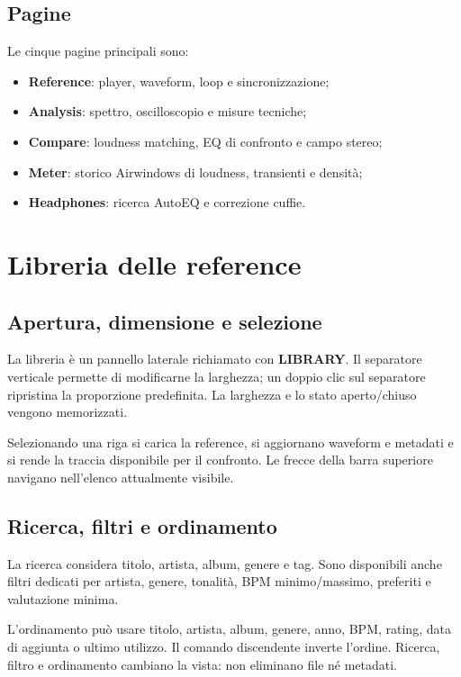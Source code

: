 \documentclass[11pt,a4paper]{article}
\newcommand{\control}[1]{\textbf{\textsf{#1}}}
\begin{document}
\subsection{Pagine}

Le cinque pagine principali sono:

\begin{itemize}
  \item \control{Reference}: player, waveform, loop e sincronizzazione;
  \item \control{Analysis}: spettro, oscilloscopio e misure tecniche;
  \item \control{Compare}: loudness matching, EQ di confronto e campo stereo;
  \item \control{Meter}: storico Airwindows di loudness, transienti e densità;
  \item \control{Headphones}: ricerca AutoEQ e correzione cuffie.
\end{itemize}

\section{Libreria delle reference}

\subsection{Apertura, dimensione e selezione}

La libreria è un pannello laterale richiamato con \control{LIBRARY}. Il
separatore verticale permette di modificarne la larghezza; un doppio clic sul
separatore ripristina la proporzione predefinita. La larghezza e lo stato
aperto/chiuso vengono memorizzati.

Selezionando una riga si carica la reference, si aggiornano waveform e metadati
e si rende la traccia disponibile per il confronto. Le frecce della barra
superiore navigano nell'elenco attualmente visibile.

\subsection{Ricerca, filtri e ordinamento}

La ricerca considera titolo, artista, album, genere e tag. Sono disponibili
anche filtri dedicati per artista, genere, tonalità, BPM minimo/massimo,
preferiti e valutazione minima.

L'ordinamento può usare titolo, artista, album, genere, anno, BPM, rating, data
di aggiunta o ultimo utilizzo. Il comando discendente inverte l'ordine.
Ricerca, filtro e ordinamento cambiano la vista: non eliminano file né
metadati.
\end{document}
